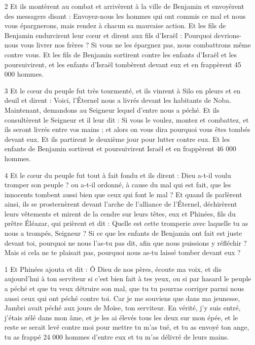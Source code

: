 \par 2 Et ils montèrent au combat et arrivèrent à la ville de Benjamin et envoyèrent des messagers disant : Envoyez-nous les hommes qui ont commis ce mal et nous vous épargnerons, mais rendez à chacun sa mauvaise action. Et les fils de Benjamin endurcirent leur cœur et dirent aux fils d'Israël : Pourquoi devrions-nous vous livrer nos frères ? Si vous ne les épargnez pas, nous combattrons même contre vous. Et les fils de Benjamin sortirent contre les enfants d'Israël et les poursuivirent, et les enfants d'Israël tombèrent devant eux et en frappèrent 45 000 hommes.

\par 3 Et le cœur du peuple fut très tourmenté, et ils vinrent à Silo en pleurs et en deuil et dirent : Voici, l'Éternel nous a livrés devant les habitants de Noba. Maintenant, demandons au Seigneur lequel d'entre nous a péché. Et ils consultèrent le Seigneur et il leur dit : Si vous le voulez, montez et combattez, et ils seront livrés entre vos mains ; et alors on vous dira pourquoi vous êtes tombés devant eux. Et ils partirent le deuxième jour pour lutter contre eux. Et les enfants de Benjamin sortirent et poursuivirent Israël et en frappèrent 46 000 hommes.

\par 4 Et le cœur du peuple fut tout à fait fondu et ils dirent : Dieu a-t-il voulu tromper son peuple ? ou a-t-il ordonné, à cause du mal qui est fait, que les innocents tombent aussi bien que ceux qui font le mal ? Et quand ils parlèrent ainsi, ils se prosternèrent devant l'arche de l'alliance de l'Éternel, déchirèrent leurs vêtements et mirent de la cendre sur leurs têtes, eux et Phinées, fils du prêtre Éléazar, qui prièrent et dit : Quelle est cette tromperie avec laquelle tu as nous a trompés, Seigneur ? Si ce que les enfants de Benjamin ont fait est juste devant toi, pourquoi ne nous l'as-tu pas dit, afin que nous puissions y réfléchir ? Mais si cela ne te plaisait pas, pourquoi nous as-tu laissé tomber devant eux ?




\par 1 Et Phinées ajouta et dit : Ô Dieu de nos pères, écoute ma voix, et dis aujourd'hui à ton serviteur si c'est bien fait à tes yeux, ou si par hasard le peuple a péché et que tu veux détruire son mal, que tu tu pourras corriger parmi nous aussi ceux qui ont péché contre toi. Car je me souviens que dans ma jeunesse, Jambri avait péché aux jours de Moïse, ton serviteur. En vérité, j'y suis entré, j'étais zélé dans mon âme, et je les ai élevés tous les deux sur mon épée, et le reste se serait levé contre moi pour mettre tu m'as tué, et tu as envoyé ton ange, tu as frappé 24 000 hommes d'entre eux et tu m'as délivré de leurs mains.

